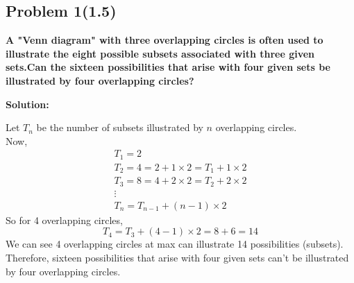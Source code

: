 

\subsection{Problem 1(1.5)} 
\textbf{A "Venn diagram" with three overlapping circles is often used to illustrate
the eight possible subsets associated with three given sets.Can the sixteen possibilities that arise with four given sets be illustrated by four overlapping circles?}

\par

\begin{flushleft}
\textbf{Solution: } \par
Let $T_n$ be the number of subsets illustrated by $n$ overlapping circles.\\
Now,
$$
\begin{array}{l}
T_1=2 \\
T_2=4=2+1 \times 2=T_1+1 \times 2 \\
T_3=8=4+2 \times 2=T_2+2 \times 2 \\
\vdots \\
T_n=T_{n-1}+(n-1) \times 2
\end{array}
$$
So for 4 overlapping circles,
$$
T_4=T_3+(4-1) \times 2=8+6=14
$$
We can see 4 overlapping circles at max can illustrate 14 possibilities (subsets).
Therefore, sixteen possibilities that arise with four given sets can't be illustrated by four overlapping
circles.
\end{flushleft}
